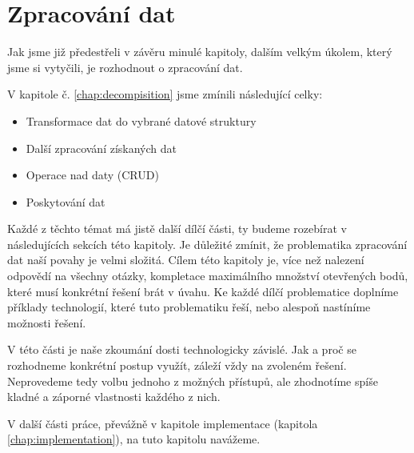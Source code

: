 \chapter{Zpracování dat} \label{chap:processing}
Jak jsme již předestřeli v závěru minulé kapitoly, dalším velkým úkolem, který jsme si vytyčili, je rozhodnout o zpracování dat.\par
\noindent V kapitole č. \ref{chap:decompisition} jsme zmínili následující celky:
\begin{itemize}
    \item Transformace dat do vybrané datové struktury
    \item Další zpracování získaných dat
    \item Operace nad daty (CRUD)
    \item Poskytování dat
\end{itemize}
Každé z těchto témat má jistě další dílčí části, ty budeme rozebírat v následujících sekcích této kapitoly. Je důležité zmínit, že problematika zpracování dat naší povahy je velmi složitá. Cílem této kapitoly je, více než nalezení odpovědí na všechny otázky, kompletace maximálního množství otevřených bodů, které musí konkrétní řešení brát v úvahu. Ke každé dílčí problematice doplníme příklady technologií, které tuto problematiku řeší, nebo alespoň nastíníme možnosti řešení.
\par
V této části je naše zkoumání dosti technologicky závislé. Jak a proč se rozhodneme konkrétní postup využít, záleží vždy na zvoleném řešení. Neprovedeme tedy volbu jednoho z možných přístupů, ale zhodnotíme spíše kladné a záporné vlastnosti každého z nich.\par
V další části práce, převážně v kapitole implementace (kapitola \ref{chap:implementation}), na tuto kapitolu navážeme.

